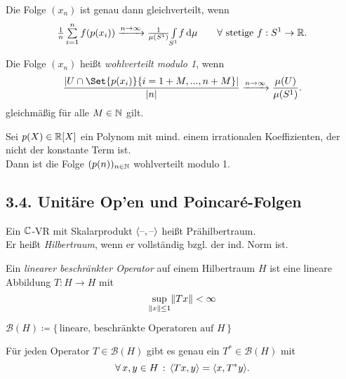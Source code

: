 \documentclass{cheat-sheet}
\newcommand{\Boun}{\mathcal{B}} %
\newcommand{\scp}[2]{\langle #1 , #2 \rangle} %
\begin{document}
\begin{lem}
  Die Folge $(x_n)$ ist genau dann gleichverteilt, wenn
  \[
    \tfrac{1}{n} \sum_{i=1}^n f(p(x_i)) \xrightarrow{n \to \infty} \tfrac{1}{\mu(S^1)} \Int{S^1}{}{f}{\mu} \qquad
    \text{$\forall$ stetige $f : S^1 \to \R$.}
  \]
\end{lem}

\begin{defn}
  Die Folge $(x_n)$ heißt \emph{wohlverteilt modulo 1}, wenn
  \[ \frac{\abs{U \cap \Set{p(x_i)}{i=1+M,\nldots,n+M}}}{\abs{n}} \xrightarrow{n \to \infty} \frac{\mu(U)}{\mu(S^1)}. \]
  gleichmäßig für alle $M \in \mathbb{N}$ gilt.
\end{defn}

\begin{thm}
  Sei $p(X) \in \mathbb{R}[X]$ ein Polynom mit mind. einem irrationalen Koeffizienten, der nicht der konstante Term ist. \\
  Dann ist die Folge $(p(n))_{n \in \mathbb{N}}$ wohlverteilt modulo 1.
\end{thm}

\begin{samepage}
  \section{3.4. Unitäre Op'en und Poincaré-Folgen}
\end{samepage}

\begin{defn}
  Ein $\mathbb{C}$-VR mit Skalarprodukt $\scp{\blank}{\blank}$ heißt Prähilbertraum. \\
  Er heißt \emph{Hilbertraum}, wenn er vollständig bzgl. der ind. Norm ist.
\end{defn}

\begin{defn}
  Ein \emph{linearer beschränkter Operator} auf einem Hilbertraum $H$ ist eine lineare Abbildung $T : H \to H$ mit
  \[ \sup_{\lVert x\rVert \leq 1} \lVert Tx\rVert < \infty \]
\end{defn}

\begin{nota}
  $\Boun(H) \coloneqq \{ \, \text{lineare, beschränkte Operatoren auf $H$} \, \}$
\end{nota}

\begin{thm}
  Für jeden Operator $T \!\in\! \Boun(H)$ gibt es genau ein $T^* \!\in\! \Boun(H)$ mit
  \[ \fa{x, y \in H} \scp{Tx}{y} = \scp{x}{T^* y}. \]
\end{thm}
\end{document}
